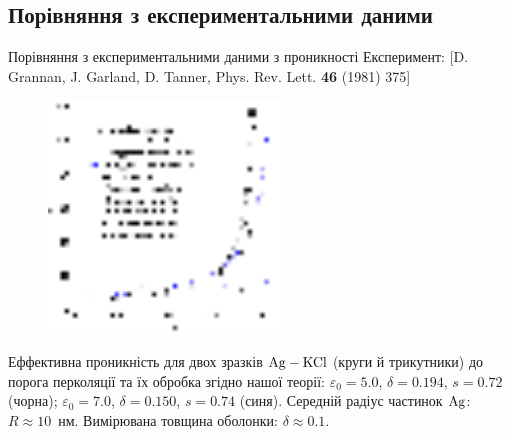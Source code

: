 \documentclass[10pt]{beamer}
\begin{document}
\subsection{Порівняння з експериментальними даними}
\begin{frame}{Порівняння з експериментальними даними з проникності}
\scriptsize{Експеримент: [D. Grannan, J. Garland, D. Tanner, Phys. Rev. Lett. {\bf 46} (1981) 375]}
\footnotesize

\begin{figure}[tb]
    \centering
    \includegraphics[width=0.55\textwidth]{images/chen-fin.eps}
\end{figure}
\vspace{-10pt}
    Еффективна проникність для двох зразків $\rm Ag-KCl$ (круги й трикутники) до порога перколяції та їх обробка згідно нашої теорії: $\varepsilon_0 = 5.0$, $\delta = 0.194$, $s = 0.72$ (чорна); $\varepsilon_0 = 7.0$, $\delta = 0.150$, $s = 0.74$ (синя). Середній радіус частинок $\rm Ag$: $R\approx 10$~нм. Вимірювана товщина оболонки: $\delta \approx 0.1$.
\end{frame}
\end{document}
